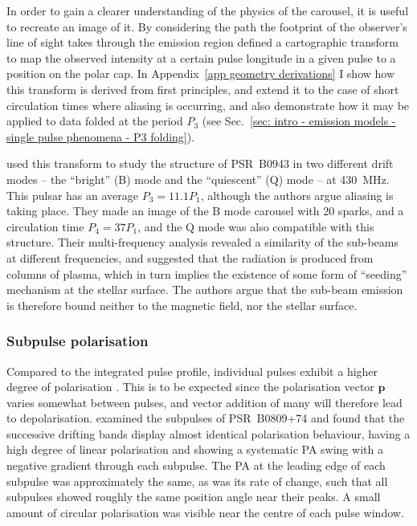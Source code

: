 In order to gain a clearer understanding of the physics of the carousel, it is useful to recreate an image of it. By considering the path the footprint of the observer's line of sight takes through the emission region \citet{DRxx1999} defined a cartographic transform to map the observed intensity at a certain pulse longitude in a given pulse to a position on the polar cap. In Appendix~\ref{app geometry derivations} I show how this transform is derived from first principles, and extend it to the case of short circulation times where aliasing is occurring, and also demonstrate how it may be applied to data folded at the period $P_3$ (see Sec.~\ref{sec: intro - emission models - single pulse phenomena - P3 folding}). 

\citet{DRxx2001} used this transform to study the structure of PSR~B0943 in two different drift modes -- the ``bright'' (B) mode and the ``quiescent'' (Q) mode -- at 430~MHz. This pulsar has an average $P_3 = 11.1 P_1$, although the authors argue aliasing is taking place. They made an image of the B mode carousel with 20 sparks, and a circulation time $P_4 = 37 P_1$, and the Q mode was also compatible with this structure. Their multi-frequency analysis revealed a similarity of the sub-beams at different frequencies, and suggested that the radiation is produced from columns of plasma, which in turn implies the existence of some form of ``seeding'' mechanism at the stellar surface. The authors argue that the sub-beam emission is therefore bound neither to the magnetic field, nor the stellar surface.

\subsubsection*{Subpulse polarisation}
\label{sec: intro - emission models - single pulse phenomena - subpulse polarisation}

Compared to the integrated pulse profile, individual pulses exhibit a higher degree of polarisation \citep[see][]{PulsarAstronomy}. This is to be expected since the polarisation vector $\mathbf{p}$ varies somewhat between pulses, and vector addition of many will therefore lead to depolarisation. \citet{THHM1971} examined the subpulses of PSR~B0809+74 and found that the successive drifting bands display almost identical polarisation behaviour, having a high degree of linear polarisation and showing a systematic PA swing with a negative gradient through each subpulse. The PA at the leading edge of each subpulse was approximately the same, as was its rate of change, such that all subpulses showed roughly the same position angle near their peaks. A small amount of circular polarisation was visible near the centre of each pulse window.

